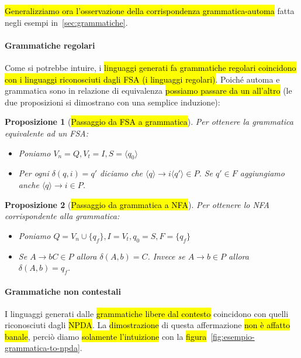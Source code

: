 \documentclass[a4paper,11pt,oneside]{article}
\theoremstyle{plain}
\newtheorem{prop}{Proposizione}[section]
\theoremstyle{definition}
\theoremstyle{remark}
\begin{document}
\hl{Generalizziamo ora l'osservazione della corrispondenza grammatica-automa}
fatta negli esempi in~\ref{sec:grammatiche}.

\paragraph{Grammatiche regolari} Come si potrebbe intuire, i \hl{linguaggi
generati fa grammatiche regolari coincidono con i linguaggi riconosciuti dagli
FSA (i linguaggi regolari)}. Poiché automa e grammatica sono in relazione di
equivalenza \hl{possiamo passare da un all'altro} (le due proposizioni si
dimostrano con una semplice induzione):

\begin{prop}[\hl{Passaggio da FSA a grammatica}]
  Per ottenere la grammatica equivalente ad un FSA\@:

  \begin{itemize}
    \item Poniamo $V_n = Q, V_t = I, S = \langle q_0 \rangle$
    \item Per ogni $\delta(q, i) = q'$ diciamo che $\langle q \rangle \to i
      \langle q' \rangle \in P $. Se $q' \in F$ aggiungiamo anche $\langle q
      \rangle \to  i \in P$.
  \end{itemize}
\end{prop}

\begin{prop}[\hl{Passaggio da grammatica a NFA}]
  Per ottenere lo NFA corrispondente alla grammatica:

  \begin{itemize}
    \item Poniamo $Q = V_n \cup \{q_f\}, I = V_t, q_0 = S, F = \{q_f\} $
    \item Se $A \to bC \in P$ allora $\delta(A,b) = C$. Invece se $A \to b \in
      P$ allora $\delta(A, b) = q_f$.
  \end{itemize}
\end{prop}

\paragraph{Grammatiche non contestali} I linguaggi generati dalle
\hl{grammatiche libere dal contesto} coincidono con quelli riconosciuti dagli
\hl{NPDA}\@. La \hl{dimostrazione} di questa affermazione \hl{non è affatto
banale}, perciò diamo \hl{solamente l'intuizione} con la
\hl{figura}~\ref{fig:esempio-grammatica-to-npda}.
\end{document}
